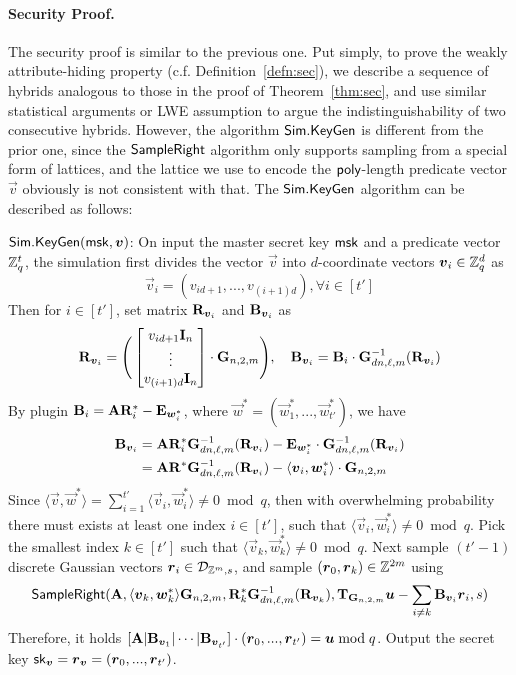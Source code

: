 \paragraph{Security Proof.} The security proof is similar to the previous one. Put simply, to prove the weakly attribute-hiding property (c.f. Definition~\ref{defn:sec}), we describe a sequence of hybrids analogous to those in the proof of Theorem~\ref{thm:sec}, and use similar statistical arguments or LWE assumption to argue the indistinguishability of two consecutive hybrids. However, the algorithm $\mathsf{Sim}.\mathsf{KeyGen}$ is different from the prior one, since the $\mathsf{SampleRight}$ algorithm only supports sampling from a special form of lattices, and the lattice we use to encode the $\mathsf{poly}$-length predicate vector $\vec{v}$ obviously is not consistent with that. The $\mathsf{Sim}.\mathsf{KeyGen}$ algorithm can be described as follows:
\begin{description}
 \item $\mathsf{Sim}.\mathsf{KeyGen}(\mathsf{msk}, \boldsymbol{v})$: On input the master secret key $\mathsf{msk}$ and a predicate vector $\mathbb{Z}_q^t$, the simulation first divides the vector $\vec{v}$ into $d$-coordinate vectors $\boldsymbol{v}_i \in \mathbb{Z}_q^d$ as
 $$\vec{v}_i = (v_{id + 1},..., v_{(i + 1)d}), \forall i \in [t']$$
 Then for $i \in [t']$, set matrix $\mathbf{R}_{\boldsymbol{v}_i}$ and  $\mathbf{B}_{\boldsymbol{v}_i}$ as
 $$\mathbf{R}_{\boldsymbol{v}_i} =
 \Bigg(\begin{bmatrix}
v_{id + 1}\mathbf{I}_n \\
\vdots \\
v_{(i + 1)d}\mathbf{I}_n
\end{bmatrix} \cdot \mathbf{G}_{n, 2, m}\Bigg), \quad \mathbf{B}_{\boldsymbol{v}_i} = \mathbf{B}_i \cdot \mathbf{G}_{dn, \ell, m}^{-1}(\mathbf{R}_{\boldsymbol{v}_i})$$
By plugin $\mathbf{B}_i = \mathbf{A} \mathbf{R}^*_i - \mathbf{E}_{\boldsymbol{w}^*_i}$, where $\vec{w}^* = (\vec{w}_1^*,..., \vec{w}_{t'}^*)$, we have
\begin{align*}
\mathbf{B}_{\boldsymbol{v}_i} & = \mathbf{A} \mathbf{R}_i^*\mathbf{G}_{dn, \ell, m}^{-1}(\mathbf{R}_{\boldsymbol{v}_i}) -  \mathbf{E}_{\boldsymbol{w}_i^*} \cdot \mathbf{G}_{dn, \ell, m}^{-1}(\mathbf{R}_{\boldsymbol{v}_i}) \\
 & = \mathbf{A} \mathbf{R}^*\mathbf{G}_{dn, \ell, m}^{-1}(\mathbf{R}_{\boldsymbol{v}_i}) - \langle \boldsymbol{v}_i, \boldsymbol{w}_i^* \rangle \cdot \mathbf{G}_{n, 2, m}
\end{align*}
Since $\langle \vec{v}, \vec{w}^* \rangle = \sum_{i  = 1}^{t'} \langle \vec{v}_i, \vec{w}_i^* \rangle \neq 0 \bmod q$, then with overwhelming probability there must exists at least one index $i \in [t']$, such that $\langle \vec{v}_i, \vec{w}_i^* \rangle \neq 0 \bmod q$. Pick the smallest index $k \in [t']$ such that $\langle \vec{v}_k, \vec{w}_k^* \rangle \neq 0 \bmod q$. Next sample $(t' - 1)$ discrete Gaussian vectors $\boldsymbol{r}_i \in \mathcal{D}_{\mathbb{Z}^m, s}$, and sample $(\boldsymbol{r}_0, \boldsymbol{r}_k) \in \mathbb{Z}^{2m}$ using
$$\mathsf{SampleRight}(\mathbf{A}, \langle \boldsymbol{v}_k, \boldsymbol{w}_k^* \rangle\mathbf{G}_{n, 2, m}, \mathbf{R}_k^*\mathbf{G}_{dn, \ell, m}^{-1}(\mathbf{R}_{\boldsymbol{v}_k}), \mathbf{T}_{\mathbf{G}_{n, 2, m}}  \boldsymbol{u} - \sum_{i \neq k} \mathbf{B}_{\boldsymbol{v}_i} \boldsymbol{r}_i , s)$$
Therefore, it holds $[\mathbf{A} | \mathbf{B}_{\boldsymbol{v}_1} | \cdots | \mathbf{B}_{\boldsymbol{v}_{t'}}] \cdot (\boldsymbol{r}_0,..., \boldsymbol{r}_{t'}) = \boldsymbol{u} \bmod q$. Output the secret key $\mathsf{sk}_{\boldsymbol{v}} = \boldsymbol{r}_{\boldsymbol{v}} = (\boldsymbol{r}_0,..., \boldsymbol{r}_{t'})$.
\end{description}
